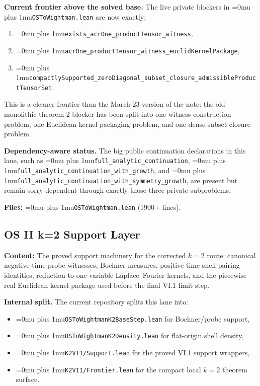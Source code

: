 \documentclass[11pt,a4paper]{article}
\newcommand{\leanfile}[1]{\begingroup\Urlmuskip=0mu plus 1mu\relax\nolinkurl{#1}\endgroup}
\newcommand{\leanname}[1]{\begingroup\Urlmuskip=0mu plus 1mu\relax\nolinkurl{#1}\endgroup}
\begin{document}
\medskip\noindent
\textbf{Current frontier above the solved base.}
The live private blockers in \leanfile{OSToWightman.lean} are now exactly:
\begin{enumerate}
\item \leanname{exists\_acrOne\_productTensor\_witness},
\item \leanname{acrOne\_productTensor\_witness\_euclidKernelPackage},
\item \leanname{compactlySupported\_zeroDiagonal\_subset\_closure\_admissibleProductTensorSet}.
\end{enumerate}
This is a cleaner frontier than the March-23 version of the note: the old
monolithic theorem-2 blocker has been split into one witness-construction
problem, one Euclidean-kernel packaging problem, and one dense-subset closure
problem.

\medskip\noindent
\textbf{Dependency-aware status.}
The big public continuation declarations in this lane, such as
\leanname{full\_analytic\_continuation},
\leanname{full\_analytic\_continuation\_with\_growth}, and
\leanname{full\_analytic\_continuation\_with\_symmetry\_growth}, are present
but remain sorry-dependent through exactly those three private subproblems.

\textbf{Files:} \leanname{OSToWightman.lean} (1900+ lines).

\subsection{OS II k=2 Support Layer}

\textbf{Content:} The proved support machinery for the corrected $k=2$ route:
canonical negative-time probe witnesses, Bochner measures, positive-time shell
pairing identities, reduction to one-variable Laplace--Fourier kernels, and the
piecewise real Euclidean kernel package used before the final VI.1 limit step.

\medskip\noindent
\textbf{Internal split.}
The current repository splits this lane into:
\begin{itemize}
\item \leanfile{OSToWightmanK2BaseStep.lean} for Bochner/probe support,
\item \leanfile{OSToWightmanK2Density.lean} for flat-origin shell density,
\item \leanfile{K2VI1/Support.lean} for the proved VI.1 support wrappers,
\item \leanfile{K2VI1/Frontier.lean} for the compact local $k=2$ theorem
  surface.
\end{itemize}
\end{document}

